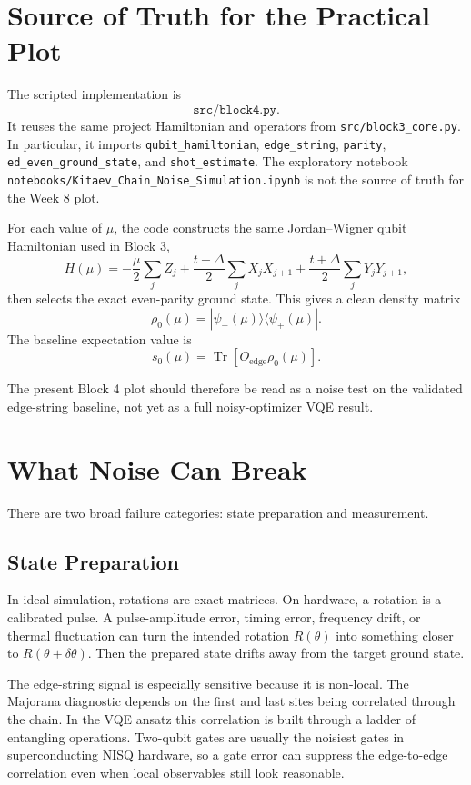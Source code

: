 \documentclass[11pt]{article}
\newcommand{\ket}[1]{|#1\rangle}
\newcommand{\bra}[1]{\langle#1|}
\newcommand{\Tr}{\operatorname{Tr}}
\begin{document}
\section{Source of Truth for the Practical Plot}

The scripted implementation is
\[
  \texttt{src/block4.py}.
\]
It reuses the same project Hamiltonian and operators from \texttt{src/block3\_core.py}. In particular, it imports \texttt{qubit\_hamiltonian}, \texttt{edge\_string}, \texttt{parity}, \texttt{ed\_even\_ground\_state}, and \texttt{shot\_estimate}. The exploratory notebook \texttt{notebooks/Kitaev\_Chain\_Noise\_Simulation.ipynb} is not the source of truth for the Week 8 plot.

For each value of $\mu$, the code constructs the same Jordan--Wigner qubit Hamiltonian used in Block 3,
\[
H(\mu) = -\frac{\mu}{2}\sum_j Z_j
+ \frac{t-\Delta}{2}\sum_j X_jX_{j+1}
+ \frac{t+\Delta}{2}\sum_j Y_jY_{j+1},
\]
then selects the exact even-parity ground state. This gives a clean density matrix
\[
  \rho_0(\mu)=\ket{\psi_+(\mu)}\bra{\psi_+(\mu)}.
\]
The baseline expectation value is
\[
  s_0(\mu)=\Tr\!\left[O_{\mathrm{edge}}\rho_0(\mu)\right].
\]

The present Block 4 plot should therefore be read as a noise test on the validated edge-string baseline, not yet as a full noisy-optimizer VQE result.

\section{What Noise Can Break}

There are two broad failure categories: state preparation and measurement.

\subsection{State Preparation}

In ideal simulation, rotations are exact matrices. On hardware, a rotation is a calibrated pulse. A pulse-amplitude error, timing error, frequency drift, or thermal fluctuation can turn the intended rotation $R(\theta)$ into something closer to $R(\theta+\delta\theta)$. Then the prepared state drifts away from the target ground state.

The edge-string signal is especially sensitive because it is non-local. The Majorana diagnostic depends on the first and last sites being correlated through the chain. In the VQE ansatz this correlation is built through a ladder of entangling operations. Two-qubit gates are usually the noisiest gates in superconducting NISQ hardware, so a gate error can suppress the edge-to-edge correlation even when local observables still look reasonable.
\end{document}
